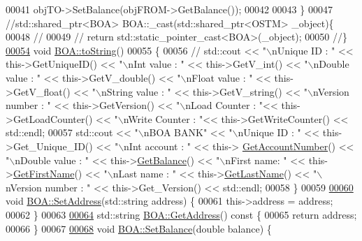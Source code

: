 \begin{DoxyCode}
00041     objTO->SetBalance(objFROM->GetBalance());
00042         
00043 \}
00047 \textcolor{comment}{//std::shared\_ptr<BOA> BOA::\_cast(std::shared\_ptr<OSTM> \_object)\{}
00048 \textcolor{comment}{//}
00049 \textcolor{comment}{//    return std::static\_pointer\_cast<BOA>(\_object);}
00050 \textcolor{comment}{//\}}
\hypertarget{_b_o_a_8cpp_source.tex_l00054}{}\hyperlink{class_b_o_a_a348df0299997f81bcad0ec034dab0b8d}{00054} \textcolor{comment}{}\textcolor{keywordtype}{void} \hyperlink{class_b_o_a_a348df0299997f81bcad0ec034dab0b8d}{BOA::toString}()
00055 \{
00056    \textcolor{comment}{// std::cout << "\(\backslash\)nUnique ID : " << this->GetUniqueID() << "\(\backslash\)nInt value : " << this->GetV\_int() <<
       "\(\backslash\)nDouble value : " << this->GetV\_double() << "\(\backslash\)nFloat value : " << this->GetV\_float() << "\(\backslash\)nString value : " <<
       this->GetV\_string()  << "\(\backslash\)nVersion number : " << this->GetVersion() << "\(\backslash\)nLoad Counter : "<<
       this->GetLoadCounter() << "\(\backslash\)nWrite Counter : "<< this->GetWriteCounter() << std::endl;}
00057      std::cout << \textcolor{stringliteral}{"\(\backslash\)nBOA BANK"} << \textcolor{stringliteral}{"\(\backslash\)nUnique ID : "} << this->Get\_Unique\_ID() << \textcolor{stringliteral}{"\(\backslash\)nInt account : "} << this->
      \hyperlink{class_b_o_a_ad64bd63675f8902153aa6767994f05dc}{GetAccountNumber}() << \textcolor{stringliteral}{"\(\backslash\)nDouble value : "} << this->\hyperlink{class_b_o_a_a07e30b7e5f5f20392b94af7344fd550c}{GetBalance}() << \textcolor{stringliteral}{"\(\backslash\)nFirst name:
       "} << this->\hyperlink{class_b_o_a_ae6bb3df4e1fb210610325ffd1985c7c0}{GetFirstName}() << \textcolor{stringliteral}{"\(\backslash\)nLast name : "} << this->\hyperlink{class_b_o_a_a081383edefc1f66b80c3fb8862ab070b}{GetLastName}()  << \textcolor{stringliteral}{"\(\backslash\)nVersion
       number : "} << this->Get\_Version() << std::endl;
00058 \}
00059 
\hypertarget{_b_o_a_8cpp_source.tex_l00060}{}\hyperlink{class_b_o_a_a2568c0027af6534bd08dde882e892caf}{00060} \textcolor{keywordtype}{void} \hyperlink{class_b_o_a_a2568c0027af6534bd08dde882e892caf}{BOA::SetAddress}(std::string address) \{
00061     this->address = address;
00062 \}
00063 
\hypertarget{_b_o_a_8cpp_source.tex_l00064}{}\hyperlink{class_b_o_a_aa4aa2cf1ef0e876bb7911c00b5374493}{00064} std::string \hyperlink{class_b_o_a_aa4aa2cf1ef0e876bb7911c00b5374493}{BOA::GetAddress}()\textcolor{keyword}{ const }\{
00065     \textcolor{keywordflow}{return} address;
00066 \}
00067 
\hypertarget{_b_o_a_8cpp_source.tex_l00068}{}\hyperlink{class_b_o_a_a0e06a7b7669b6a26a41b37d68f0a87b8}{00068} \textcolor{keywordtype}{void} \hyperlink{class_b_o_a_a0e06a7b7669b6a26a41b37d68f0a87b8}{BOA::SetBalance}(\textcolor{keywordtype}{double} balance) \{

\end{DoxyCode}
